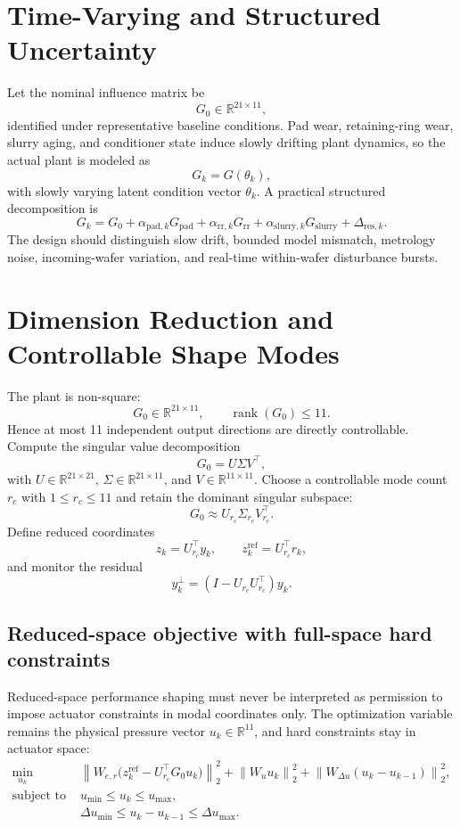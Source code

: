 \documentclass[11pt,a4paper]{article}
\newcommand{\R}{\mathbb{R}}
\newcommand{\norm}[1]{\left\lVert #1 \right\rVert}
\begin{document}
\section{Time-Varying and Structured Uncertainty}
Let the nominal influence matrix be
\[
G_0\in\R^{21\times 11},
\]
identified under representative baseline conditions. Pad wear, retaining-ring wear, slurry aging, and conditioner state induce slowly drifting plant dynamics, so the actual plant is modeled as
\[
G_k=G(\theta_k),
\]
with slowly varying latent condition vector $\theta_k$.
A practical structured decomposition is
\[
G_k=G_0+\alpha_{\mathrm{pad},k}G_{\mathrm{pad}}+\alpha_{\mathrm{rr},k}G_{\mathrm{rr}}+\alpha_{\mathrm{slurry},k}G_{\mathrm{slurry}}+\Delta_{\mathrm{res},k}.
\]
The design should distinguish slow drift, bounded model mismatch, metrology noise, incoming-wafer variation, and real-time within-wafer disturbance bursts.

\section{Dimension Reduction and Controllable Shape Modes}
The plant is non-square:
\[
G_0\in\R^{21\times 11},\qquad \operatorname{rank}(G_0)\le 11.
\]
Hence at most 11 independent output directions are directly controllable. Compute the singular value decomposition
\[
G_0=U\Sigma V^\top,
\]
with $U\in\R^{21\times 21}$, $\Sigma\in\R^{21\times 11}$, and $V\in\R^{11\times 11}$. Choose a controllable mode count $r_c$ with $1\le r_c\le 11$ and retain the dominant singular subspace:
\[
G_0\approx U_{r_c}\Sigma_{r_c}V_{r_c}^\top.
\]
Define reduced coordinates
\[
z_k=U_{r_c}^\top y_k,\qquad z_k^{\mathrm{ref}}=U_{r_c}^\top r_k,
\]
and monitor the residual
\[
y_k^{\perp}=(I-U_{r_c}U_{r_c}^\top)y_k.
\]

\subsection{Reduced-space objective with full-space hard constraints}
Reduced-space performance shaping must never be interpreted as permission to impose actuator constraints in modal coordinates only. The optimization variable remains the physical pressure vector $u_k\in\R^{11}$, and hard constraints stay in actuator space:
\begin{align*}
\min_{u_k}\quad &\norm{W_{e,r}\big(z_k^{\mathrm{ref}}-U_{r_c}^\top G_0u_k\big)}_2^2+\norm{W_u u_k}_2^2+\norm{W_{\Delta u}(u_k-u_{k-1})}_2^2,\\
\text{subject to}\quad &u_{\min}\le u_k\le u_{\max},\\
&\Delta u_{\min}\le u_k-u_{k-1}\le \Delta u_{\max}.
\end{align*}
\end{document}
